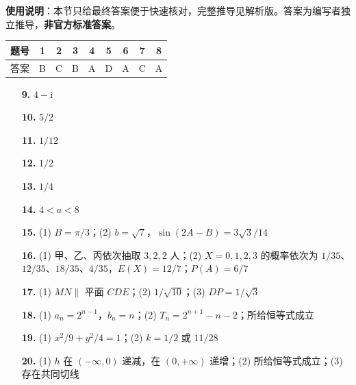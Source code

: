 
\begin{gknotice}
\textbf{使用说明}：本节只给最终答案便于快速核对，完整推导见解析版。答案为编写者独立推导，\textbf{非官方标准答案}。
\end{gknotice}

\begin{center}\begin{tabular}{ccccccccc}
\toprule
题号 & 1 & 2 & 3 & 4 & 5 & 6 & 7 & 8 \\
\midrule
答案 & B & C & B & A & D & A & C & A \\
\bottomrule
\end{tabular}\end{center}

\begin{itemize}[leftmargin=2.6em]
  \item[\textbf{9.}] $4-\mathrm i$
  \item[\textbf{10.}] $5/2$
  \item[\textbf{11.}] $1/12$
  \item[\textbf{12.}] $1/2$
  \item[\textbf{13.}] $1/4$
  \item[\textbf{14.}] $4<a<8$
\end{itemize}

\begin{itemize}[leftmargin=2.6em]
  \item[\textbf{15.}] (1) $B=\pi/3$；(2) $b=\sqrt7$，$\sin(2A-B)=3\sqrt3/14$
  \item[\textbf{16.}] (1) 甲、乙、丙依次抽取 $3,2,2$ 人；(2) $X=0,1,2,3$ 的概率依次为 $1/35$、$12/35$、$18/35$、$4/35$，$E(X)=12/7$；$P(A)=6/7$
  \item[\textbf{17.}] (1) $MN\parallel$ 平面 $CDE$；(2) $1/\sqrt{10}$；(3) $DP=1/\sqrt3$
  \item[\textbf{18.}] (1) $a_n=2^{n-1}$，$b_n=n$；(2) $T_n=2^{n+1}-n-2$；所给恒等式成立
  \item[\textbf{19.}] (1) $x^2/9+y^2/4=1$；(2) $k=1/2$ 或 $11/28$
  \item[\textbf{20.}] (1) $h$ 在 $(-\infty,0)$ 递减，在 $(0,+\infty)$ 递增；(2) 所给恒等式成立；(3) 存在共同切线
\end{itemize}
